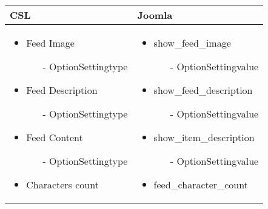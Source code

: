 \begin{minipage}{0.63\textwidth}
\begin{tabular}{|p{} | p{}|}
\hline
\textbf{CSL} & \textbf{Joomla} \\ 
\hline
\begin{itemize}
\item Feed Image
\begin{enumerate}
    \item[-] OptionSettingtype
 \end{enumerate}  
\item Feed Description
\begin{enumerate}
    \item[-] OptionSettingtype
 \end{enumerate}  
\item Feed Content
\begin{enumerate}
    \item[-] OptionSettingtype
 \end{enumerate}  
\item Characters count 
 \end{itemize}
 &
 \begin{itemize}
\item show\_feed\_image
\begin{enumerate}
    \item[-] OptionSettingvalue
 \end{enumerate} 
\item show\_feed\_description
\begin{enumerate}
    \item[-] OptionSettingvalue
 \end{enumerate}  
\item show\_item\_description
\begin{enumerate}
    \item[-] OptionSettingvalue
 \end{enumerate}  
\item feed\_character\_count 
 \end{itemize} 
\\
\hline
\end{tabular}
\end{minipage}

